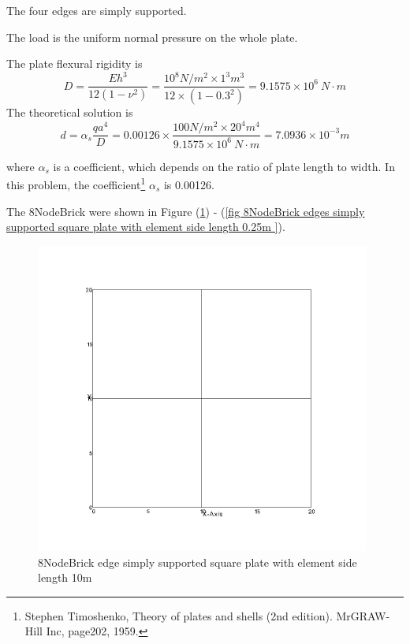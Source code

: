 \documentclass[fleqn,11pt,letter]{article}
\begin{document}
The four edges are simply supported. 

The load is the uniform normal pressure on the whole plate. 

The plate flexural rigidity is 
\begin{equation}
  D=\frac{Eh^3}{12(1-\nu^2)}=\frac{10^8 N/m^2 \times 1^3 m^3 }{12 \times (1-0.3^2) }= 9.1575 \times 10^6 \ N\cdot m
\end{equation}
The theoretical solution is 
\begin{equation}
  d=\alpha_s \frac{q a^4}{D}=0.00126\times \frac{100 N/m^2 \times 20^4 m^4}{9.1575 \times 10^6 \ N\cdot m}=7.0936\times 10^{-3} m
\end{equation}

where $\alpha_s$ is a coefficient, which depends on the ratio of plate length to width. In this problem, the coefficient\footnote{Stephen Timoshenko, Theory of plates and shells (2nd edition). MrGRAW-Hill Inc, page202, 1959.} $\alpha_s$ is 0.00126.


The 8NodeBrick were shown in Figure (\ref{fig 8NodeBrick edges simply supported square plate with element side length 10m }) - (\ref{fig 8NodeBrick edges simply supported square plate with element side length 0.25m }). 



\begin{figure}[H]
  \centering
  \includegraphics[width=11cm]{../Figure_files/8NodeBrick/square_plate1.png}
  \caption{8NodeBrick edge simply supported square plate with element side length 10m }
  \label{fig 8NodeBrick edges simply supported square plate with element side length 10m }
\end{figure}
\end{document}
